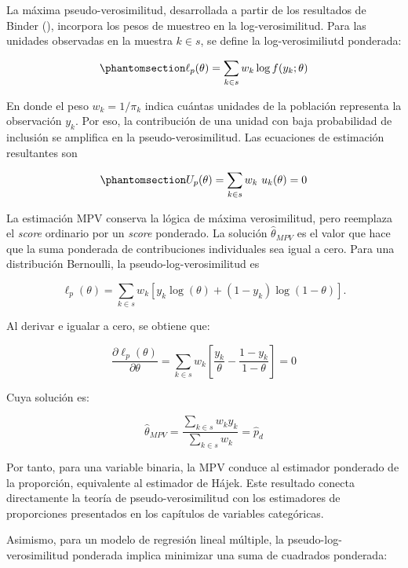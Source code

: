 \documentclass[
  spanish,
  11pt,
  letterpaper,
  oneside,
  open=any]{scrbook}
\begin{document}
La máxima pseudo-verosimilitud, desarrollada a partir de los resultados
de Binder (), incorpora los
pesos de muestreo en la log-verosimilitud. Para las unidades observadas
en la muestra \(k \in s\), se define la log-verosimiliutd ponderada:

\begin{equation}\protect\phantomsection\label{eq-log-pseudoverosimilitud-general}{
\ell_p(\theta)
= \sum_{k \in s} w_k \log f(y_k;\theta)
}\end{equation}

En donde el peso \(w_k=1/\pi_k\) indica cuántas unidades de la población
representa la observación \(y_k\). Por eso, la contribución de una
unidad con baja probabilidad de inclusión se amplifica en la
pseudo-verosimilitud. Las ecuaciones de estimación resultantes son

\begin{equation}\protect\phantomsection\label{eq-puntuacion-ponderada}{
U_p(\theta)
= \sum_{k \in s} w_k \ u_k(\theta)
= 0
}\end{equation}

La estimación MPV conserva la lógica de máxima verosimilitud, pero
reemplaza el \emph{score} ordinario por un \emph{score} ponderado. La
solución \(\hat{\theta}_{MPV}\) es el valor que hace que la suma
ponderada de contribuciones individuales sea igual a cero. Para una
distribución Bernoulli, la pseudo-log-verosimilitud es

\[
\ell_p(\theta)
= \sum_{k \in s} w_k
\left[
y_k\log(\theta)
+(1-y_k)\log(1-\theta)
\right].
\]

Al derivar e igualar a cero, se obtiene que:

\[
\frac{\partial \ell_p(\theta)}{\partial \theta}
=
\sum_{k \in s} w_k
\left[
\frac{y_k}{\theta}
-\frac{1-y_k}{1-\theta}
\right]
=0
\]

Cuya solución es:

\[
\hat{\theta}_{MPV}
=
\frac{\sum_{k \in s}w_k y_k}
     {\sum_{k \in s}w_k}
= \hat{p}_d
\]

Por tanto, para una variable binaria, la MPV conduce al estimador
ponderado de la proporción, equivalente al estimador de Hájek. Este
resultado conecta directamente la teoría de pseudo-verosimilitud con los
estimadores de proporciones presentados en los capítulos de variables
categóricas.

Asimismo, para un modelo de regresión lineal múltiple, la
pseudo-log-verosimilitud ponderada implica minimizar una suma de
cuadrados ponderada:
\end{document}
